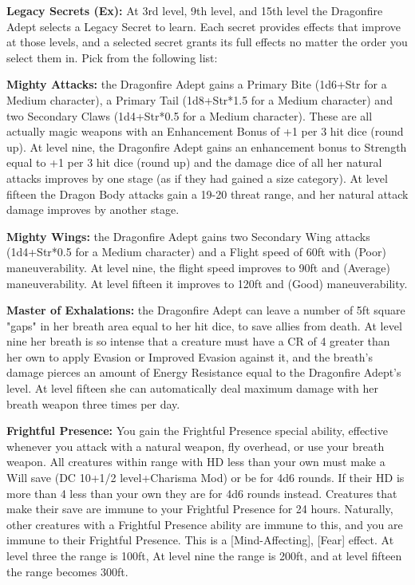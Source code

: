 \textbf{Legacy Secrets (Ex):} At 3rd level, 9th level, and 15th level the Dragonfire Adept selects a Legacy Secret to learn. Each secret provides effects that improve at those levels, and a selected secret grants its full effects no matter the order you select them in. Pick from the following list:

\begin{itemize*}
\item \textbf{Mighty Attacks:} the Dragonfire Adept gains a Primary Bite (1d6+Str for a Medium character), a Primary Tail (1d8+Str*1.5 for a Medium character) and two Secondary Claws (1d4+Str*0.5 for a Medium character). These are all actually magic weapons with an Enhancement Bonus of +1 per 3 hit dice (round up). At level nine, the Dragonfire Adept gains an enhancement bonus to Strength equal to +1 per 3 hit dice (round up) and the damage dice of all her natural attacks improves by one stage (as if they had gained a size category). At level fifteen the Dragon Body attacks gain a 19-20 threat range, and her natural attack damage improves by another stage.
\item \textbf{Mighty Wings:} the Dragonfire Adept gains two Secondary Wing attacks (1d4+Str*0.5 for a Medium character) and a Flight speed of 60ft with (Poor) maneuverability. At level nine, the flight speed improves to 90ft  and (Average) maneuverability. At level fifteen it improves to 120ft and (Good) maneuverability.
\item \textbf{Master of Exhalations:} the Dragonfire Adept can leave a number of 5ft square "gaps" in her breath area equal to her hit dice, to save allies from death. At level nine her breath is so intense that a creature must have a CR of 4 greater than her own to apply Evasion or Improved Evasion against it, and the breath's damage pierces an amount of Energy Resistance equal to the Dragonfire Adept's level. At level fifteen she can automatically deal maximum damage with her breath weapon three times per day.
\item \textbf{Frightful Presence:} You gain the Frightful Presence special ability, effective whenever you attack with a natural weapon, fly overhead, or use your breath weapon. All creatures within range with HD less than your own must make a Will save (DC 10+1/2 level+Charisma Mod) or be  for 4d6 rounds. If their HD is more than 4 less than your own they are  for 4d6 rounds instead. Creatures that make their save are immune to your Frightful Presence for 24 hours. Naturally, other creatures with a Frightful Presence ability are immune to this, and you are immune to their Frightful Presence. This is a [Mind-Affecting], [Fear] effect. At level three the range is 100ft, At level nine the range is 200ft, and at level fifteen the range becomes 300ft.

\end{itemize*}
